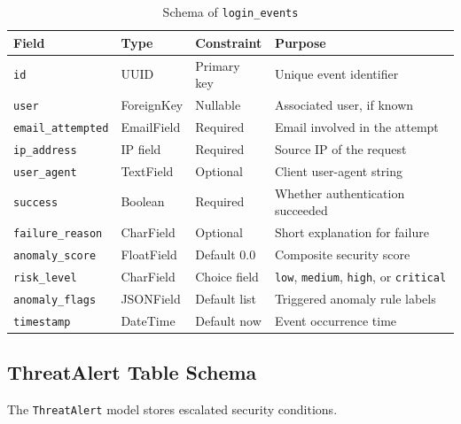 \begin{table}[H]
\centering
\small
\caption{Schema of \texttt{login\_events}}
\label{tab:login-events}
\begin{tabular}{|p{3.0cm}|p{2.8cm}|p{1.8cm}|p{6.0cm}|}
\hline
\textbf{Field} & \textbf{Type} & \textbf{Constraint} & \textbf{Purpose} \\
\hline
\texttt{id} & UUID & Primary key & Unique event identifier \\
\hline
\texttt{user} & ForeignKey & Nullable & Associated user, if known \\
\hline
\texttt{email\_attempted} & EmailField & Required & Email involved in the attempt \\
\hline
\texttt{ip\_address} & IP field & Required & Source IP of the request \\
\hline
\texttt{user\_agent} & TextField & Optional & Client user-agent string \\
\hline
\texttt{success} & Boolean & Required & Whether authentication succeeded \\
\hline
\texttt{failure\_reason} & CharField & Optional & Short explanation for failure \\
\hline
\texttt{anomaly\_score} & FloatField & Default 0.0 & Composite security score \\
\hline
\texttt{risk\_level} & CharField & Choice field & \texttt{low}, \texttt{medium}, \texttt{high}, or \texttt{critical} \\
\hline
\texttt{anomaly\_flags} & JSONField & Default list & Triggered anomaly rule labels \\
\hline
\texttt{timestamp} & DateTime & Default now & Event occurrence time \\
\hline
\end{tabular}
\end{table}

\subsection{ThreatAlert Table Schema}
The \texttt{ThreatAlert} model stores escalated security conditions.

